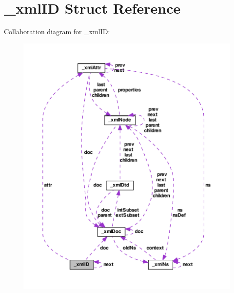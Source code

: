 \hypertarget{struct__xml_i_d}{\section{\-\_\-xml\-I\-D Struct Reference}
\label{struct__xml_i_d}
}


Collaboration diagram for \-\_\-xml\-I\-D\-:
\nopagebreak
\begin{figure}[H]
\begin{center}
\leavevmode
\includegraphics[width=350pt]{struct__xml_i_d__coll__graph}
\end{center}
\end{figure}
